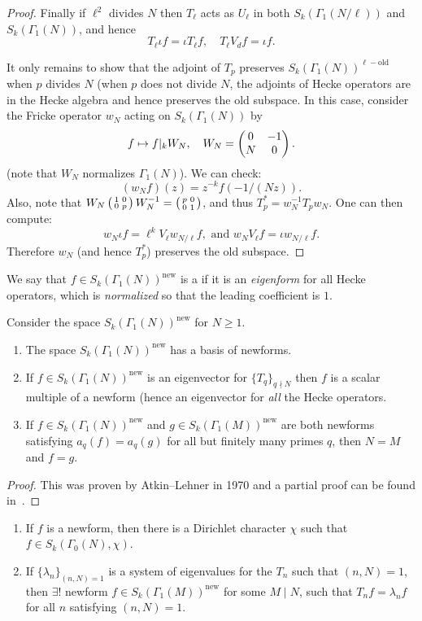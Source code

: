 \begin{proof}
Finally if $\ell^2$ divides $N$ then $T_\ell$ acts as $U_\ell$ in both $S_k(\Gamma_1(N/\ell))$ and $S_k(\Gamma_1(N))$, and hence
\[
T_\ell \iota f = \iota T_\ell f,\quad T_\ell V_d f = \iota f.
\]

It only remains to show that the adjoint of $T_p$ preserves $S_k(\Gamma_1(N))^{\ell-\text{old}}$ when $p$ divides $N$ (when $p$ does not divide $N$, the adjoints of Hecke operators are in the Hecke algebra and hence preserves the old subspace. In this case, consider the Fricke operator $w_N$ acting on $S_k(\Gamma_1(N))$ by
\[
f\mapsto f|_k W_N,\quad W_N=\left(\begin{matrix}0&-1\\N&0\end{matrix}\right).
\]
(note that $W_N$ normalizes $\Gamma_1(N)$). We can check:
\[
(w_N f)(z) = z^{-k}f(-1/(Nz)).
\]
Also, note that $W_N\left(\begin{smallmatrix}1&0\\0&p\end{smallmatrix}\right) W_N^{-1} = \left(\begin{smallmatrix}p&0\\0&1\end{smallmatrix}\right)$, and thus $T_p^* = w_N^{-1} T_p w_N$. One can then compute:
\[
w_N\iota f = \ell^k V_\ell w_{N/\ell} f,\text{ and } w_N V_\ell f = \iota w_{N/\ell} f.
\]
Therefore $w_N$ (and hence $T_p^*$) preserves the old subspace.
\end{proof}

We say that $f\in S_k(\Gamma_1(N))^\text{new}$ is a  if it is an \emph{eigenform} for all Hecke operators, which is \emph{normalized} so that the leading coefficient is $1$.
\begin{theorem}
Consider the space $S_k(\Gamma_1(N))^\text{new}$ for $N\geq 1$.
  \begin{enumerate}
  \item The space $S_k(\Gamma_1(N))^\text{new}$ has a basis of newforms.
  \item If $f\in S_k(\Gamma_1(N))^\text{new}$ is an eigenvector for $\{T_q\}_{q\nmid N}$ then $f$ is a scalar multiple of a newform (hence an eigenvector for \emph{all} the Hecke operators.
  \item If  $f\in S_k(\Gamma_1(N))^\text{new}$ and $g\in S_k(\Gamma_1(M))^\text{new}$ are both newforms satisfying $a_q(f)=a_q(g)$ for all but finitely many primes $q$, then $N=M$ and $f=g$.
  \end{enumerate}
\end{theorem}
\begin{proof}
  This  was proven by Atkin--Lehner in 1970 and a partial proof can be found in~\cite{diamond-shurman}.
\end{proof}

\begin{corollary}
\label{cor:atkinlehner}
  \begin{enumerate}
  \item   If $f$ is a newform, then there is a Dirichlet character $\chi$ such that $f\in S_k(\Gamma_0(N),\chi)$.
\item If $\{\lambda_n\}_{(n,N)=1}$ is a system of eigenvalues for the $T_n$ such that $(n,N)=1$, then $\exists !$ newform $f\in S_k(\Gamma_1(M))^\text{new}$ for some $M\mid N$, such that $T_nf = \lambda_n f$ for all $n$ satisfying $(n,N)=1$.
  \end{enumerate}
\end{corollary}

